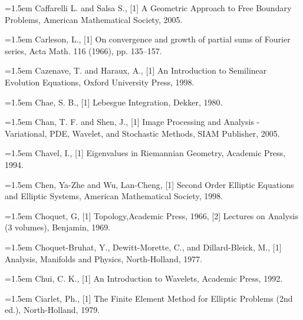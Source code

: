 \noindent\hangindent=1.5em Caffarelli L. and Salsa S., \hypertarget{ref:CaffarelliSalsa-1}{[1]} A Geometric Approach to Free Boundary Problems, American Mathematical Society, 2005.\par{}
\noindent\hangindent=1.5em Carleson, L., \hypertarget{ref:Carleson-1}{[1]} On convergence and growth of partial sums of Fourier series, Acta Math. 116 (1966), pp. 135--157.\par{}
\noindent\hangindent=1.5em Cazenave, T. and Haraux, A., \hypertarget{ref:CazenaveHaraux-1}{[1]} An Introduction to Semilinear Evolution Equations, Oxford University Press, 1998.\par{}
\noindent\hangindent=1.5em Chae, S. B., \hypertarget{ref:Chae-1}{[1]} Lebesgue Integration, Dekker, 1980.\par{}
\noindent\hangindent=1.5em Chan, T. F. and Shen, J., \hypertarget{ref:ChanShen-1}{[1]} Image Processing and Analysis - Variational, PDE, Wavelet, and Stochastic Methods, SIAM Publisher, 2005.\par{}
\noindent\hangindent=1.5em Chavel, I., \hypertarget{ref:Chavel-1}{[1]} Eigenvalues in Riemannian Geometry, Academic Press, 1994.\par{}
\noindent\hangindent=1.5em Chen, Ya-Zhe and Wu, Lan-Cheng, \hypertarget{ref:ChenWu-1}{[1]} Second Order Elliptic Equations and Elliptic Systems, American Mathematical Society, 1998.\par{}
\noindent\hangindent=1.5em Choquet, G, \hypertarget{ref:Choquet-1}{[1]} Topology,Academic Press, 1966, \hypertarget{ref:Choquet-2}{[2]} Lectures on Analysis (3 volumes), Benjamin, 1969.\par{}
\noindent\hangindent=1.5em Choquet-Bruhat, Y., Dewitt-Morette, C., and Dillard-Bleick, M., \hypertarget{ref:ChoquetDewittDillard-1}{[1]} Analysis, Manifolds and Physics, North-Holland, 1977.\par{}
\noindent\hangindent=1.5em Chui, C. K., \hypertarget{ref:Chui-1}{[1]} An Introduction to Wavelets, Academic Press, 1992.\par{}
\noindent\hangindent=1.5em Ciarlet, Ph., \hypertarget{ref:Ciarlet-1}{[1]} The Finite Element Method for Elliptic Problems (2nd ed.), North-Holland, 1979.\par{}
